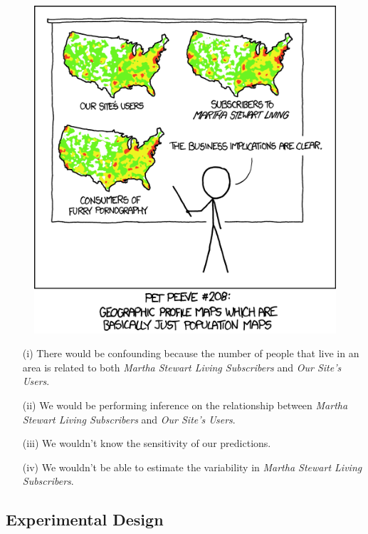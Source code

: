 \documentclass[12pt]{article}
\begin{document}
\begin{figure}[h!]
\centering
\includegraphics[width=0.7\linewidth]{datascitoolbox-heatmap}
\end{figure}

\begin{itemize}
\item[(i)] There would be confounding because the number of people that live in an area is related to both \textit{Martha Stewart Living Subscribers} and \textit{Our Site's Users}.
\item[(ii)] We would be performing inference on the relationship between \textit{Martha Stewart Living Subscribers} and \textit{Our Site's Users}.
\item[(iii)] We wouldn't know the sensitivity of our predictions.
\item[(iv)] We wouldn't be able to estimate the variability in \textit{Martha Stewart Living Subscribers}.
\end{itemize}
\newpage

\subsection*{Experimental Design}
\end{document}

